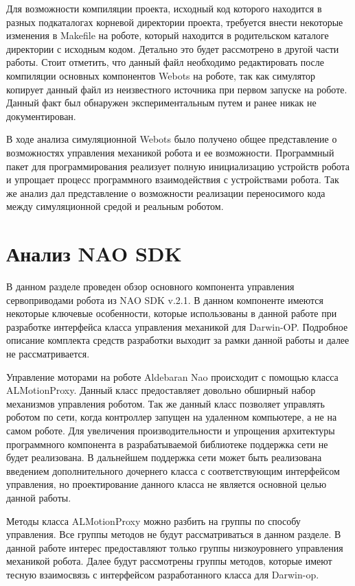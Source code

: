 
Для возможности компиляции проекта, исходный код которого находится в разных подкаталогах корневой директории проекта, требуется внести некоторые изменения в Makefile на роботе, который находится в родительском каталоге директории с исходным кодом. Детально это будет рассмотрено в другой части работы. Стоит отметить, что данный файл необходимо редактировать после компиляции основных компонентов Webots на роботе, так как симулятор копирует данный файл из неизвестного источника при первом запуске на роботе. Данный факт был обнаружен экспериментальным путем и ранее никак не документирован.

В ходе анализа симуляционной Webots было получено общее представление о возможностях управления механикой робота и ее возможности. Программный пакет для программирования реализует полную инициализацию устройств робота и упрощает процесс программного взаимодействия с устройствами робота. Так же анализ дал представление о возможности реализации переносимого кода между симуляционной средой и реальным роботом.

\section{Анализ NAO SDK}

В данном разделе проведен обзор основного компонента управления сервоприводами робота из NAO SDK v.2.1. В данном компоненте имеются некоторые ключевые особенности, которые использованы в данной работе при разработке интерфейса класса управления механикой для Darwin-OP. Подробное описание комплекта средств разработки выходит за рамки данной работы и далее не рассматривается.

Управление моторами на роботе Aldebaran Nao происходит с помощью класса ALMotionProxy\cite{urlalmotion}. Данный класс предоставляет довольно обширный набор механизмов управления роботом. Так же данный класс позволяет управлять роботом по сети, когда контроллер запущен на удаленном компьютере, а не на самом роботе. Для увеличения производительности и упрощения архитектуры программного компонента в разрабатываемой библиотеке поддержка сети не будет реализована. В дальнейшем поддержка сети может быть реализована введением дополнительного дочернего класса с соответствующим интерфейсом управления, но проектирование данного класса не является основной целью данной работы.

Методы класса ALMotionProxy можно разбить на группы по способу управления. Все группы методов не будут рассматриваться в данном разделе. В данной работе интерес предоставляют только группы низкоуровнего управления механикой робота. Далее будут рассмотрены группы методов, которые имеют тесную взаимосвязь с интерфейсом разработанного класса для Darwin-op.

